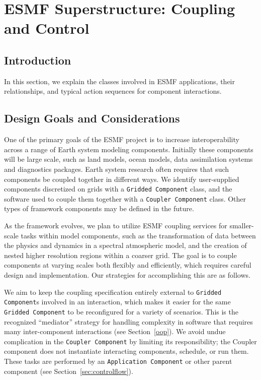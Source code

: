 \section{ESMF Superstructure:  Coupling and Control}
\label{sec:superclasses}

\subsection{Introduction}

In this section, we explain the classes involved in ESMF applications, 
their relationships, and typical action sequences for component interactions.  

\subsection{Design Goals and Considerations}

One of the primary goals of the ESMF project is to increase interoperability
across a range of Earth system modeling components.  Initially these 
components will be large scale, such as land models, ocean models, 
data assimilation systems and diagnostics packages.  Earth system research 
often requires that such components be coupled together in different
ways.  We identify user-supplied components discretized on grids with 
a {\tt Gridded Component} class, and the software used to couple them together
with a {\tt Coupler Component} class.  Other types of framework components
may be defined in the future.

As the framework evolves, we plan to utilize ESMF coupling services for 
smaller-scale tasks within model components, such as the transformation of 
data between the 
physics and dynamics in a spectral atmospheric model, and the creation 
of nested higher resolution regions within a coarser grid.  The goal is 
to couple components at varying scales both flexibly and efficiently,
which requires careful design and implementation.  Our strategies for 
accomplishing this are as follows.

We aim to keep the coupling specification entirely external 
to {\tt Gridded Component}s involved in an interaction, which makes it easier 
for the same {\tt Gridded Component} to be reconfigured for a variety of scenarios.
This is the recognized ``mediator'' strategy for handling complexity in 
software that requires many inter-component interactions (see Section~\ref{oop}).  
We avoid undue complication in the {\tt Coupler Component} by limiting
its responsibility; the Coupler component does not instantiate 
interacting components, schedule, or run them.  These tasks are performed
by an {\tt Application Component} or other parent component (see 
Section~\ref{sec:controlflow}).


